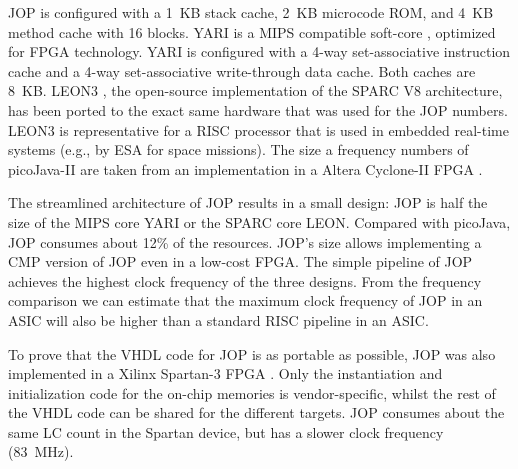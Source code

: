 JOP is configured with a 1~KB stack cache, 2~KB microcode ROM, and
4~KB method cache with 16 blocks. YARI is a MIPS compatible soft-core
\cite{cacao:yari:techrep}, optimized for FPGA technology. YARI is
configured with a 4-way set-associative instruction cache and a 4-way
set-associative write-through data cache. Both caches are 8~KB. LEON3
\cite{LEON}, the open-source implementation of the SPARC V8
architecture, has been ported to the exact same hardware that was
used for the JOP numbers. LEON3 is representative for a RISC
processor that is used in embedded real-time systems (e.g., by ESA
for space missions). The size a frequency numbers of picoJava-II
\cite{pJ1} are taken from an implementation in a Altera Cyclone-II
FPGA \cite{master:puffitsch}.



The streamlined architecture of JOP results in a small design: JOP is
half the size of the MIPS core YARI or the SPARC core LEON. Compared
with picoJava, JOP consumes about 12\% of the resources. JOP's size
allows implementing a CMP version of JOP even in a low-cost FPGA. The
simple pipeline of JOP achieves the highest clock frequency of the
three designs. From the frequency comparison we can estimate that the
maximum clock frequency of JOP in an ASIC will also be higher than a
standard RISC pipeline in an ASIC.


To prove that the VHDL code for JOP is as portable as possible, JOP
was also implemented in a Xilinx Spartan-3 FPGA \cite{Spartan3}. Only
the instantiation and initialization code for the on-chip memories is
vendor-specific, whilst the rest of the VHDL code can be shared for
the different targets. JOP consumes about the same LC count in the
Spartan device, but has a slower clock frequency (83~MHz).



